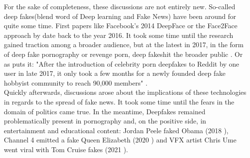 \documentclass[
  a4paper,  %
  twoside,  %
  bibliography=totoc,
  headsepline,
  cleardoublepage=empty,
  parskip=half,
  draft=false
]{scrbook}
\begin{document}
For the sake of completeness, these discussions are not entirely new. So-called deep fakes(blend word of Deep learning and Fake News) have been around for quite some time. First papers like Facebook's 2014 DeepFace \cite{taigmanDeepFaceClosingGap2014} or the Face2Face approach by \citet{thiesFace2FaceRealtimeFace2020} date back to the year 2016. It took some time until the research gained traction among a broader audience, but at the latest in 2017, in the form of deep fake pornography or revenge porn, deep fakeshit the broader public \cite{coleAIAssistedFakePorn2017}. Or as \citeauthor{westerlundEmergenceDeepfakeTechnology2019a} puts it: "After the introduction of celebrity porn deepfakes to Reddit by one user in late 2017, it only took a few months for a newly founded deep fake hobbyist community to reach 90,000 members" \cite{westerlundEmergenceDeepfakeTechnology2019a}. \\
Quickly afterwards, discussions arose about the implications of these technologies in regards to the spread of fake news. It took some time until the fears in the domain of politics came true. In the meantime, Deepfakes remained problematically present in pornography and, on the positive side, in entertainment and educational content: Jordan Peele faked Obama (2018 \cite{vincentWatchJordanPeele2018}), Channel 4 emitted a fake Queen Elizabeth (2020 \cite{DeepfakeQueenDeliver2020}) and VFX artist Chris Ume went viral with Tom Cruise fakes (2021 \cite{vincentTomCruiseDeepfake2021}).
\end{document}
